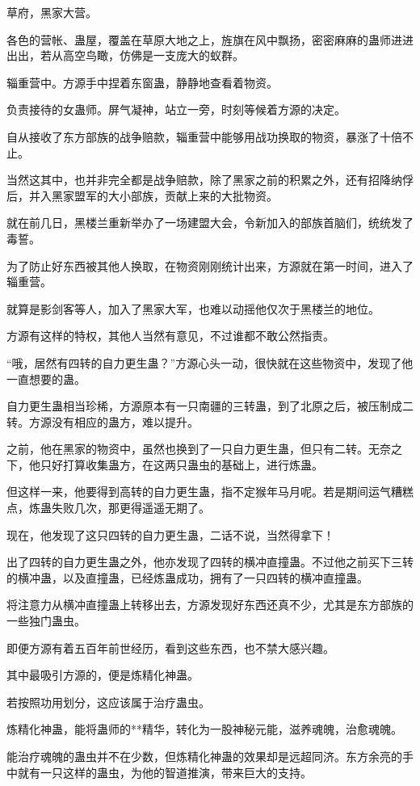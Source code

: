 \begin{this_body}
草府，黑家大营。

各色的营帐、蛊屋，覆盖在草原大地之上，旌旗在风中飘扬，密密麻麻的蛊师进进出出，若从高空鸟瞰，仿佛是一支庞大的蚁群。

辎重营中。方源手中捏着东窗蛊，静静地查看着物资。

负责接待的女蛊师。屏气凝神，站立一旁，时刻等候着方源的决定。

自从接收了东方部族的战争赔款，辎重营中能够用战功换取的物资，暴涨了十倍不止。

当然这其中，也并非完全都是战争赔款，除了黑家之前的积累之外，还有招降纳俘后，并入黑家盟军的大小部族，贡献上来的大批物资。

就在前几日，黑楼兰重新举办了一场建盟大会，令新加入的部族首脑们，统统发了毒誓。

为了防止好东西被其他人换取，在物资刚刚统计出来，方源就在第一时间，进入了辎重营。

就算是影剑客等人，加入了黑家大军，也难以动摇他仅次于黑楼兰的地位。

方源有这样的特权，其他人当然有意见，不过谁都不敢公然指责。

“哦，居然有四转的自力更生蛊？”方源心头一动，很快就在这些物资中，发现了他一直想要的蛊。

自力更生蛊相当珍稀，方源原本有一只南疆的三转蛊，到了北原之后，被压制成二转。方源没有相应的蛊方，难以提升。

之前，他在黑家的物资中，虽然也换到了一只自力更生蛊，但只有二转。无奈之下，他只好打算收集蛊方，在这两只蛊虫的基础上，进行炼蛊。

但这样一来，他要得到高转的自力更生蛊，指不定猴年马月呢。若是期间运气糟糕点，炼蛊失败几次，那更得遥遥无期了。

现在，他发现了这只四转的自力更生蛊，二话不说，当然得拿下！

出了四转的自力更生蛊之外，他亦发现了四转的横冲直撞蛊。不过他之前买下三转的横冲蛊，以及直撞蛊，已经炼蛊成功，拥有了一只四转的横冲直撞蛊。

将注意力从横冲直撞蛊上转移出去，方源发现好东西还真不少，尤其是东方部族的一些独门蛊虫。

即便方源有着五百年前世经历，看到这些东西，也不禁大感兴趣。

其中最吸引方源的，便是炼精化神蛊。

若按照功用划分，这应该属于治疗蛊虫。

炼精化神蛊，能将蛊师的**精华，转化为一股神秘元能，滋养魂魄，治愈魂魄。

能治疗魂魄的蛊虫并不在少数，但炼精化神蛊的效果却是远超同济。东方余亮的手中就有一只这样的蛊虫，为他的智道推演，带来巨大的支持。


\end{this_body}
